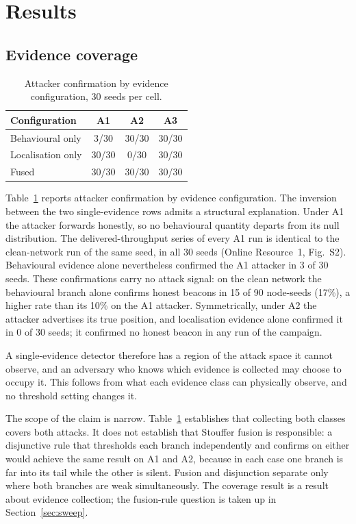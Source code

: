 \section{Results}
\label{sec:results}

\subsection{Evidence coverage}
\label{sec:coverage}

\begin{table}[!t]
\caption{Attacker confirmation by evidence configuration, 30 seeds per cell.}
\label{tab:coverage}
\centering
\footnotesize
\begin{tabular}{@{}lccc@{}}
\toprule
Configuration & A1 & A2 & A3 \\
\midrule
Behavioural only & 3/30 & 30/30 & 30/30 \\
Localisation only & 30/30 & 0/30 & 30/30 \\
Fused & 30/30 & 30/30 & 30/30 \\
\bottomrule
\end{tabular}
\end{table}

Table~\ref{tab:coverage} reports attacker
confirmation by evidence configuration. The inversion between the two
single-evidence rows admits a structural explanation. Under A1 the attacker
forwards honestly, so no behavioural quantity departs from its null
distribution. The delivered-throughput series of every A1 run is identical to
the clean-network run of the same seed, in all 30 seeds (Online Resource~1, Fig.~S2).
Behavioural evidence alone nevertheless confirmed the A1 attacker in 3 of 30
seeds. These confirmations carry no attack signal: on the clean network the
behavioural branch alone confirms honest beacons in 15 of 90 node-seeds (17\%),
a higher rate than its 10\% on the A1 attacker. Symmetrically, under A2 the
attacker advertises its true position, and localisation evidence alone
confirmed it in 0 of 30 seeds; it confirmed no honest beacon in any run of the
campaign.

A single-evidence detector therefore has a region of the attack space it
cannot observe, and an adversary who knows which evidence is collected may
choose to occupy it. This follows from what each evidence class can physically
observe, and no threshold setting changes it.

The scope of the claim is narrow. Table~\ref{tab:coverage} establishes that
collecting both classes covers both attacks. It does not establish that
Stouffer fusion is responsible: a disjunctive rule that thresholds each branch
independently and confirms on either would achieve the same result on A1 and
A2, because in each case one branch is far into its tail while the other is
silent. Fusion and disjunction separate only where both branches are weak
simultaneously. The coverage result is a result about evidence collection; the
fusion-rule question is taken up in Section~\ref{sec:sweep}.


